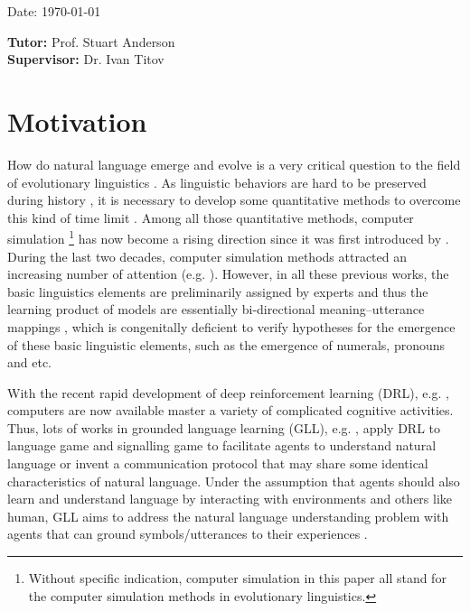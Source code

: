 \documentclass[a4paper,11pt]{article}
\newcommand{\tutor}{Prof. Stuart Anderson}
\newcommand{\supervisor}{Dr. Ivan Titov}
\begin{document}
\vspace*{3cm}
Date: \today

\vfill
{\bf Tutor:} \tutor\\
{\bf Supervisor:} \supervisor
\newpage

\setcounter{page}{1}                            %
\footruleheight{1pt}
\headruleheight{1pt}
\rhead{- \thepage}
\cfoot{}
%
\tableofcontents     

\section{Motivation}
\label{sec:1intro}

How do natural language emerge and evolve is a very critical question to the field of evolutionary linguistics \cite{macwhinney2013emergence}. As linguistic behaviors are hard to be preserved during history \cite{lieberman2006toward}, it is necessary to develop some quantitative methods to overcome this kind of time limit \cite{evans2009myth}. Among all those quantitative methods, computer simulation \footnote{Without specific indication, computer simulation in this paper all stand for the computer simulation methods in evolutionary linguistics.} has now become a rising direction since it was first introduced by \cite{hurford1989biological}. During the last two decades, computer simulation methods attracted an increasing number of attention (e.g. \cite{hurford1998approaches, knight2000evolutionary, briscoe2002book, cangelosi2012simulating, christiansen2003language, bickerton2009biological}). However, in all these previous works, the basic linguistics elements are preliminarily assigned by experts and thus the learning product of models are essentially bi-directional meaning–utterance mappings \cite{gong2013computer}, which is congenitally deficient to verify hypotheses for the emergence of these basic linguistic elements, such as the emergence of numerals, pronouns and etc.

With the recent rapid development of deep reinforcement learning (DRL), e.g.  \cite{mnih2015human, silver2017mastering}, computers are now available master a variety of complicated cognitive activities. Thus, lots of works in grounded language learning (GLL), e.g.  \cite{hermann2017grounded, havrylov2017emergence, mordatch2018emergence}, apply DRL to language game \cite{wittgenstein2009philosophical} and signalling game \cite{lewis2008convention} to facilitate agents to understand natural language or invent a communication protocol that may share some identical characteristics of natural language. Under the assumption that agents should also learn and understand language by interacting with environments and others like human, GLL aims to address the natural language understanding problem with agents that can ground symbols/utterances to their experiences \cite{hill2017understanding}.
\end{document}
